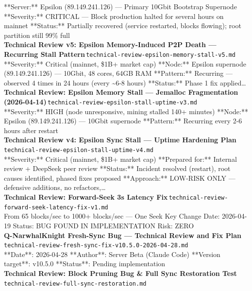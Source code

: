 \documentclass[11pt,a4paper]{article}
\begin{document}
**Server:** Epsilon (89.149.241.126) --- Primary 10Gbit Bootstrap Supernode **Severity:** CRITICAL --- Block production halted for several hours on mainnet **Status:** Partially recovered (service restarted, blocks flowing); root partition still 99\% full\\[6pt]
\noindent\textbf{Technical Review v5: Epsilon Memory-Induced P2P Death --- Recurring Stall Pattern}\,\textcolor{qgray}{\small \texttt{technical-review-epsilon-memory-stall-v5.md}}\\
**Severity:** Critical (mainnet, \$1B+ market cap) **Node:** Epsilon supernode (89.149.241.126) --- 10Gbit, 48 cores, 64GB RAM **Pattern:** Recurring --- observed 4 times in 24 hours (every \textasciitilde{}6-8 hours) **Status:** Phase 1 fix applied\ldots{}\\[6pt]
\noindent\textbf{Technical Review: Epsilon Memory Stall --- Jemalloc Fragmentation (2026-04-14)}\,\textcolor{qgray}{\small \texttt{technical-review-epsilon-stall-uptime-v3.md}}\\
**Severity:** HIGH (node unresponsive, mining stalled 140+ minutes) **Node:** Epsilon (89.149.241.126) --- 10Gbit supernode **Pattern:** Recurring every 2-6 hours after restart\\[6pt]
\noindent\textbf{Technical Review v4: Epsilon Sync Stall --- Uptime Hardening Plan}\,\textcolor{qgray}{\small \texttt{technical-review-epsilon-stall-uptime-v4.md}}\\
**Severity:** Critical (mainnet, \$1B+ market cap) **Prepared for:** Internal review + DeepSeek peer review **Status:** Incident resolved (restart), root causes identified, phased fixes proposed **Approach:** LOW-RISK ONLY --- defensive additions, no refactors,\ldots{}\\[6pt]
\noindent\textbf{Technical Review: Forward-Seek 3s Latency Fix}\,\textcolor{qgray}{\small \texttt{technical-review-forward-seek-latency-fix-v1.md}}\\
From 65 blocks/sec to 1000+ blocks/sec --- One Seek Key Change Date: 2026-04-19 \textbar{} Status: BUG FOUND IN IMPLEMENTATION \textbar{} Risk: ZERO\\[6pt]
\noindent\textbf{Q-NarwhalKnight Fresh-Sync Bug --- Technical Review and Fix Plan}\,\textcolor{qgray}{\small \texttt{technical-review-fresh-sync-fix-v10.5.0-2026-04-28.md}}\\
**Date**: 2026-04-28 **Author**: Server Beta (Claude Code) **Version target**: v10.5.0 **Status**: Pending implementation\\[6pt]
\noindent\textbf{Technical Review: Block Pruning Bug \& Full Sync Restoration Test}\,\textcolor{qgray}{\small \texttt{technical-review-full-sync-restoration.md}}\\
\end{document}
